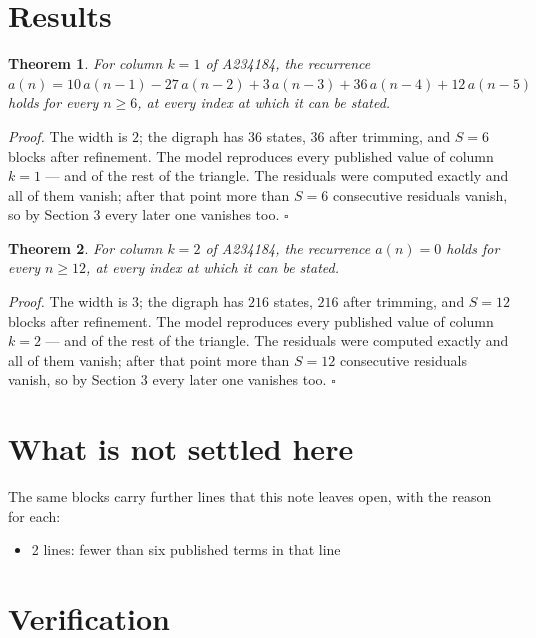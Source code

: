 \documentclass[11pt]{article}
\newtheorem{theorem}{Theorem}
\theoremstyle{definition}
\begin{document}
\section{Results}

\begin{theorem} For column $k = 1$ of A234184, the recurrence $a(n) = 10\,a(n-1) - 27\,a(n-2) + 3\,a(n-3) + 36\,a(n-4) + 12\,a(n-5)$ holds for every $n \ge 6$, at every index at which it can be stated.\end{theorem}

{\itshape Proof.} The width is $2$; the digraph has $36$ states, $36$ after trimming, and $S = 6$ blocks after refinement. The model reproduces every published value of column $k = 1$ --- and of the rest of the triangle. The residuals were computed exactly and all of them vanish; after that point more than $S = 6$ consecutive residuals vanish, so by Section 3 every later one vanishes too. $\square$

\begin{theorem} For column $k = 2$ of A234184, the recurrence $a(n) = 0$ holds for every $n \ge 12$, at every index at which it can be stated.\end{theorem}

{\itshape Proof.} The width is $3$; the digraph has $216$ states, $216$ after trimming, and $S = 12$ blocks after refinement. The model reproduces every published value of column $k = 2$ --- and of the rest of the triangle. The residuals were computed exactly and all of them vanish; after that point more than $S = 12$ consecutive residuals vanish, so by Section 3 every later one vanishes too. $\square$

\section{What is not settled here}

The same blocks carry further lines that this note leaves open, with the reason for each:

\begin{itemize}

\item 2 lines: fewer than six published terms in that line

\end{itemize}

\section{Verification}
\end{document}
